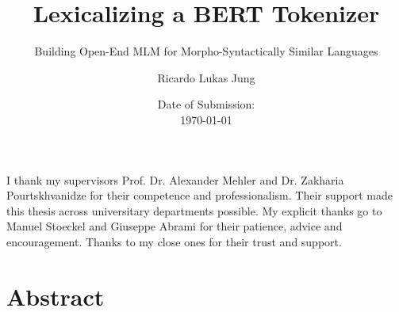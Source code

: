 \documentclass[12pt, a4paper, english]{ttlab-qualify}
\begin{document}
    \titlehead{
        Ricardo Lukas Jung\\
        6227492\\
        Empirische Sprachwissenschaft (B.A.)\\
        Phonetik \& Digital Humanities \\
        15\textsuperscript{th} Semester\\
        s2458588@stud.uni-frankfurt.de
    }
    \subject{Bachelor Thesis}
    \author{Ricardo Lukas Jung}
    \title{Lexicalizing a BERT Tokenizer}
    \subtitle{Building Open-End MLM for Morpho-Syntactically Similar Languages}
    \date{Date of Submission: \\\today}
    \publishers{Text Technology Lab\\Prof. Dr. Alexander Mehler\\Dr. Zakharia Pourtskhvanidze}

    \maketitle

    \cleardoublepage
    \thispagestyle{empty}
    I thank my supervisors Prof. Dr. Alexander Mehler and Dr. Zakharia Pourtskhvanidze for their competence and professionalism.
    Their support made this thesis across universitary departments possible.
    My explicit thanks go to Manuel Stoeckel and Giuseppe Abrami for their patience, advice and encouragement.
    Thanks to my close ones for their trust and support.

    \chapter*{Abstract}
    \thispagestyle{empty}
    



    \cleardoubleoddpage

    \tableofcontents
    \thispagestyle{empty}
    \newpage
    \listoffigures
    \setcounter{page}{1}
    \newpage
    \listoftables
    \newpage

\end{document}
